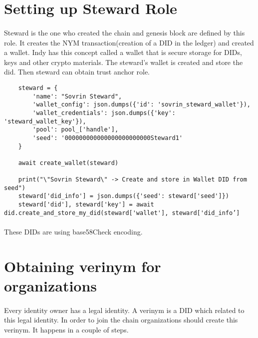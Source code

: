 \section{Setting up Steward Role}

\paragraph{}
Steward is the one who created the chain and genesis block are defined by this role. It creates the NYM transaction(creation of a DID in the ledger) and created a wallet. Indy has this concept called a wallet that is secure storage for DIDs, keys and other crypto materials. The steward’s wallet is created and store the did. Then steward can obtain trust anchor role.

\begin{verbatim}
    steward = {
        'name': "Sovrin Steward",
        'wallet_config': json.dumps({'id': 'sovrin_steward_wallet'}),
        'wallet_credentials': json.dumps({'key': 'steward_wallet_key'}),
        'pool': pool_['handle'],
        'seed': '000000000000000000000000Steward1'
    }

    await create_wallet(steward)

    print("\"Sovrin Steward\" -> Create and store in Wallet DID from seed")
    steward['did_info'] = json.dumps({'seed': steward['seed']})
    steward['did'], steward['key'] = await did.create_and_store_my_did(steward['wallet'], steward['did_info’]
\end{verbatim}

\paragraph{}
These DIDs are using base58Check encoding.

\section{Obtaining verinym for organizations}

\paragraph{}
Every identity owner has a legal identity. A verinym is a DID which related to this legal identity. In order to join the chain organizations should create this verinym. It happens in a couple of steps.

